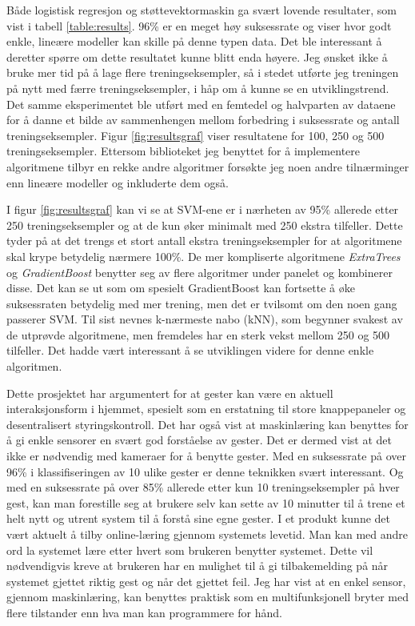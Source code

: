 Både logistisk regresjon og støttevektormaskin ga svært lovende resultater, som vist i tabell \ref{table:results}. 96\% er en meget høy suksessrate og viser hvor godt enkle, lineære modeller kan skille på denne typen data. Det ble interessant å deretter spørre om dette resultatet kunne blitt enda høyere. Jeg ønsket ikke å bruke mer tid på å lage flere treningseksempler, så i stedet utførte jeg treningen på nytt med færre treningseksempler, i håp om å kunne se en utviklingstrend. Det samme eksperimentet ble utført med en femtedel og halvparten av dataene for å danne et bilde av sammenhengen mellom forbedring i suksessrate og antall treningseksempler. Figur \ref{fig:resultsgraf} viser resultatene for 100, 250 og 500 treningseksempler. Ettersom biblioteket jeg benyttet for å implementere algoritmene tilbyr en rekke andre algoritmer forsøkte jeg noen andre tilnærminger enn lineære modeller og inkluderte dem også.

I figur \ref{fig:resultsgraf} kan vi se at SVM-ene er i nærheten av 95\% allerede etter 250 treningseksempler og at de kun øker minimalt med 250 ekstra tilfeller. Dette tyder på at det trengs et stort antall ekstra treningseksempler for at algoritmene skal krype betydelig nærmere 100\%. De mer kompliserte algoritmene \emph{ExtraTrees} og \emph{GradientBoost} benytter seg av flere algoritmer under panelet og kombinerer disse. Det kan se ut som om spesielt GradientBoost kan fortsette å øke suksessraten betydelig med mer trening, men det er tvilsomt om den noen gang passerer SVM. Til sist nevnes k-nærmeste nabo (kNN), som begynner svakest av de utprøvde algoritmene, men fremdeles har en sterk vekst mellom 250 og 500 tilfeller. Det hadde vært interessant å se utviklingen videre for denne enkle algoritmen.

Dette prosjektet har argumentert for at gester kan være en aktuell interaksjonsform i hjemmet, spesielt som en erstatning til store knappepaneler og desentralisert styringskontroll. Det har også vist at maskinlæring kan benyttes for å gi enkle sensorer en svært god forståelse av gester. Det er dermed vist at det ikke er nødvendig med kameraer for å benytte gester. Med en suksessrate på over 96\% i klassifiseringen av 10 ulike gester er denne teknikken svært interessant. Og med en suksessrate på over 85\% allerede etter kun 10 treningseksempler på hver gest, kan man forestille seg at brukere selv kan sette av 10 minutter til å trene et helt nytt og utrent system til å forstå sine egne gester. I et produkt kunne det vært aktuelt å tilby online-læring gjennom systemets levetid. Man kan med andre ord la systemet lære etter hvert som brukeren benytter systemet. Dette vil nødvendigvis kreve at brukeren har en mulighet til å gi tilbakemelding på når systemet gjettet riktig gest og når det gjettet feil. Jeg har vist at en enkel sensor, gjennom maskinlæring, kan benyttes praktisk som en multifunksjonell bryter med flere tilstander enn hva man kan programmere for hånd.\\

